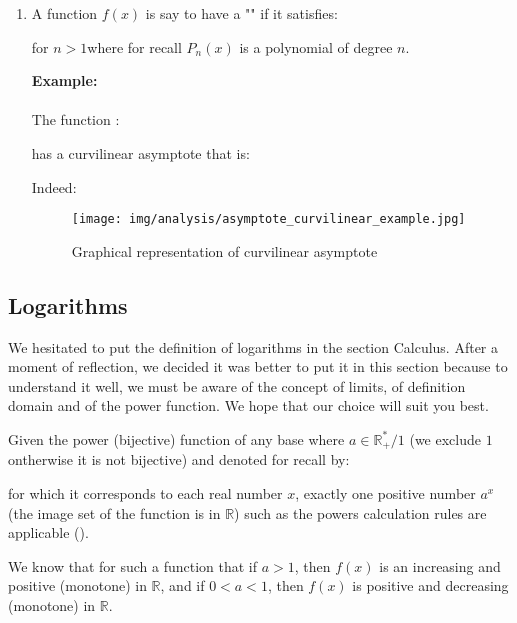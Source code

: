 \begin{enumerate}
\begin{enumerate}
			\item A function $f(x)$ is say to have a "" if it satisfies:
			
			for $n>1 $where for recall $P_n(x)$ is a polynomial of degree $n$.
			\begin{tcolorbox}[colframe=black,colback=white,sharp corners]
			\textbf{{\Large {}}Example:}\\\\
			The function :
			
			has a curvilinear asymptote that is:
			
			Indeed:
			
			 \begin{figure}[H]
				\centering
				\texttt{[image: img/analysis/asymptote\_curvilinear\_example.jpg]}
				\caption[]{Graphical representation of curvilinear asymptote}
			\end{figure}
			\end{tcolorbox}
		\end{enumerate}
	\end{enumerate}
	
	\pagebreak
	\subsection{Logarithms}
	We hesitated to put the definition of logarithms in the section Calculus. After a moment of reflection, we decided it was better to put it in this section because to understand it well, we must be aware of the concept of limits, of definition domain and of the power function. We hope that our choice will suit you best.
	
	Given the power (bijective) function of any base where $a \in \mathbb{R}_{+}^{*}/1$ (we exclude $1$ ontherwise it is not bijective) and denoted for recall by:
	
	for which it corresponds to each real number $x$, exactly one positive number $a^x$ (the image set of the function is in $\mathbb{R}$) such as the powers calculation rules are applicable ().
	
	We know that for such a function that if $a>1$, then $f (x)$ is an increasing and positive (monotone) in $\mathbb{R}$, and if $0<a<1$, then $f(x)$ is positive and decreasing (monotone) in $\mathbb{R}$.
	
